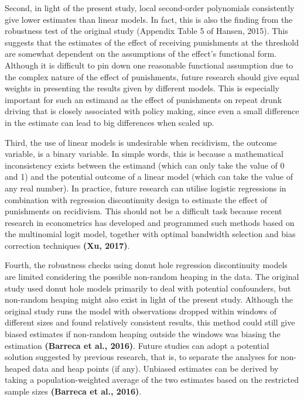 \documentclass[
  11pt,
]{article}
\begin{document}
Second, in light of the present study, local second-order polynomials
consistently give lower estimates than linear models. In fact, this is
also the finding from the robustness test of the original study
(Appendix Table 5 of Hansen, 2015). This suggests that the estimates of
the effect of receiving punishments at the threshold are somewhat
dependent on the assumptions of the effect's functional form. Although
it is difficult to pin down one reasonable functional assumption due to
the complex nature of the effect of punishments, future research should
give equal weights in presenting the results given by different models.
This is especially important for such an estimand as the effect of
punishments on repeat drunk driving that is closely associated with
policy making, since even a small difference in the estimate can lead to
big differences when scaled up.

Third, the use of linear models is undesirable when recidivism, the
outcome variable, is a binary variable. In simple words, this is because
a mathematical inconsistency exists between the estimand (which can only
take the value of 0 and 1) and the potential outcome of a linear model
(which can take the value of any real number). In practice, future
research can utilise logistic regressions in combination with regression
discontinuity design to estimate the effect of punishments on
recidivism. This should not be a difficult task because recent research
in econometrics has developed and programmed such methods based on the
multinomial logit model, together with optimal bandwidth selection and
bias correction techniques \textbf{(Xu, 2017)}.

Fourth, the robustness checks using donut hole regression discontinuity
models are limited considering the possible non-random heaping in the
data. The original study used donut hole models primarily to deal with
potential confounders, but non-random heaping might also exist in light
of the present study. Although the original study runs the model with
observations dropped within windows of different sizes and found
relatively consistent results, this method could still give biased
estimates if non-random heaping outside the windows was biasing the
estimation \textbf{(Barreca et al., 2016)}. Future studies can adopt a
potential solution suggested by previous research, that is, to separate
the analyses for non-heaped data and heap points (if any). Unbiased
estimates can be derived by taking a population-weighted average of the
two estimates based on the restricted sample sizes \textbf{(Barreca et
al., 2016)}.
\end{document}
